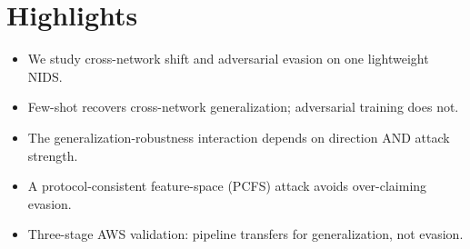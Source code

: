 \documentclass{article}
\begin{document}
\section*{Highlights}
\begin{itemize}
  \item We study cross-network shift and adversarial evasion on one lightweight NIDS.
  \item Few-shot recovers cross-network generalization; adversarial training does not.
  \item The generalization-robustness interaction depends on direction AND attack strength.
  \item A protocol-consistent feature-space (PCFS) attack avoids over-claiming evasion.
  \item Three-stage AWS validation: pipeline transfers for generalization, not evasion.
\end{itemize}
\end{document}
